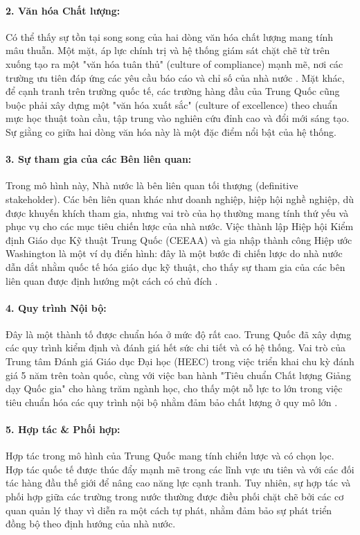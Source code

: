 \documentclass[12pt, a4paper, openany]{report}
\begin{document}
\paragraph{2. Văn hóa Chất lượng:} Có thể thấy sự tồn tại song song của hai dòng văn hóa chất lượng mang tính mâu thuẫn. Một mặt, áp lực chính trị và hệ thống giám sát chặt chẽ từ trên xuống tạo ra một "văn hóa tuân thủ" (culture of compliance) mạnh mẽ, nơi các trường ưu tiên đáp ứng các yêu cầu báo cáo và chỉ số của nhà nước \cite{ChinaEQA_Ideology2023}. Mặt khác, để cạnh tranh trên trường quốc tế, các trường hàng đầu của Trung Quốc cũng buộc phải xây dựng một "văn hóa xuất sắc" (culture of excellence) theo chuẩn mực học thuật toàn cầu, tập trung vào nghiên cứu đỉnh cao và đổi mới sáng tạo. Sự giằng co giữa hai dòng văn hóa này là một đặc điểm nổi bật của hệ thống.

\paragraph{3. Sự tham gia của các Bên liên quan:} Trong mô hình này, Nhà nước là bên liên quan tối thượng (definitive stakeholder). Các bên liên quan khác như doanh nghiệp, hiệp hội nghề nghiệp, dù được khuyến khích tham gia, nhưng vai trò của họ thường mang tính thứ yếu và phục vụ cho các mục tiêu chiến lược của nhà nước. Việc thành lập Hiệp hội Kiểm định Giáo dục Kỹ thuật Trung Quốc (CEEAA) và gia nhập thành công Hiệp ước Washington là một ví dụ điển hình: đây là một bước đi chiến lược do nhà nước dẫn dắt nhằm quốc tế hóa giáo dục kỹ thuật, cho thấy sự tham gia của các bên liên quan được định hướng một cách có chủ đích \cite{ChinaEQA_CEEAA_WA}.

\paragraph{4. Quy trình Nội bộ:} Đây là một thành tố được chuẩn hóa ở mức độ rất cao. Trung Quốc đã xây dựng các quy trình kiểm định và đánh giá hết sức chi tiết và có hệ thống. Vai trò của Trung tâm Đánh giá Giáo dục Đại học (HEEC) trong việc triển khai chu kỳ đánh giá 5 năm trên toàn quốc, cùng với việc ban hành "Tiêu chuẩn Chất lượng Giảng dạy Quốc gia" cho hàng trăm ngành học, cho thấy một nỗ lực to lớn trong việc tiêu chuẩn hóa các quy trình nội bộ nhằm đảm bảo chất lượng ở quy mô lớn \cite{ChinaEQA_HEEC_Standards}.

\paragraph{5. Hợp tác \& Phối hợp:} Hợp tác trong mô hình của Trung Quốc mang tính chiến lược và có chọn lọc. Hợp tác quốc tế được thúc đẩy mạnh mẽ trong các lĩnh vực ưu tiên và với các đối tác hàng đầu thế giới để nâng cao năng lực cạnh tranh. Tuy nhiên, sự hợp tác và phối hợp giữa các trường trong nước thường được điều phối chặt chẽ bởi các cơ quan quản lý thay vì diễn ra một cách tự phát, nhằm đảm bảo sự phát triển đồng bộ theo định hướng của nhà nước.
\end{document}
